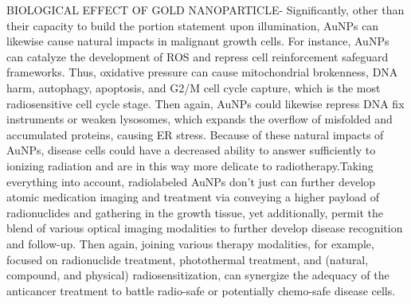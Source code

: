 \documentclass{article}
\begin{document}
\newline
\newline
BIOLOGICAL EFFECT OF GOLD NANOPARTICLE- Significantly, other than their capacity to build the portion statement upon illumination, AuNPs can likewise cause natural impacts in malignant growth cells. For instance, AuNPs can catalyze the development of ROS and repress cell reinforcement safeguard frameworks. Thus, oxidative pressure can cause mitochondrial brokenness, DNA harm, autophagy, apoptosis, and G2/M cell cycle capture, which is the most radiosensitive cell cycle stage. Then again, AuNPs could likewise repress DNA fix instruments or weaken lysosomes, which expands the overflow of misfolded and accumulated proteins, causing ER stress. Because of these natural impacts of AuNPs, disease cells could have a decreased ability to answer sufficiently to ionizing radiation and are in this way more delicate to radiotherapy.Taking everything into account, radiolabeled AuNPs don't just can further develop atomic medication imaging and treatment via conveying a higher payload of radionuclides and gathering in the growth tissue, yet additionally, permit the blend of various optical imaging modalities to further develop disease recognition and follow-up. Then again, joining various therapy modalities, for example, focused on radionuclide treatment, photothermal treatment, and (natural, compound, and physical) radiosensitization, can synergize the adequacy of the anticancer treatment to battle radio-safe or potentially chemo-safe disease cells.
\end{document}
